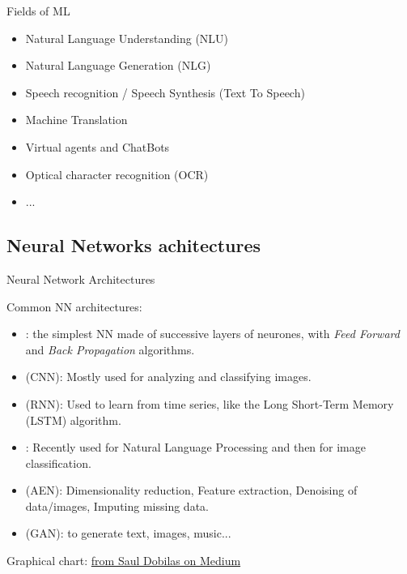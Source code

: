 \documentclass[10pt,serif,mathserif,compress,hyperref={colorlinks}]{beamer}
\begin{document}

\begin{frame}{Fields of ML}

  \begin{tcolorbox}[title=Natural Language Processing: NLP]
    \begin{itemize}
    \item<1-> Natural Language Understanding (NLU) 
    \item<1-> Natural Language Generation (NLG)
    \item<1-> Speech recognition / Speech Synthesis (Text To Speech)
    \item<1-> Machine Translation
    \item<1-> Virtual agents and ChatBots
    \item<1-> Optical character recognition (OCR)
    \item<1-> ...
    \end{itemize}
  \end{tcolorbox}   
  
\end{frame}

\subsection{Neural Networks achitectures}


\begin{frame}{Neural Network Architectures}

Common NN architectures:
\begin{itemize}
  \item {}: the simplest NN made of successive layers of neurones, with {\em Feed Forward} and {\em Back Propagation} algorithms.
  \item {} (CNN): Mostly used for analyzing and classifying images.
  \item {} (RNN): Used to learn from time series, like the Long Short-Term Memory (LSTM) algorithm.
  \item {} : Recently used for Natural Language Processing and then for image classification.
  \item {} (AEN): Dimensionality reduction, Feature extraction, Denoising of data/images, Imputing missing data.
  \item {} (GAN): to generate text, images, music...
\end{itemize}
Graphical chart: \href{https://chart-studio.plotly.com/~SolClover/90.embed?autosize=true&referrer=https\%3A\%2F\%2Ftowardsdatascience.com\%2F}{from Saul Dobilas on Medium} 
\end{frame}
\end{document}
